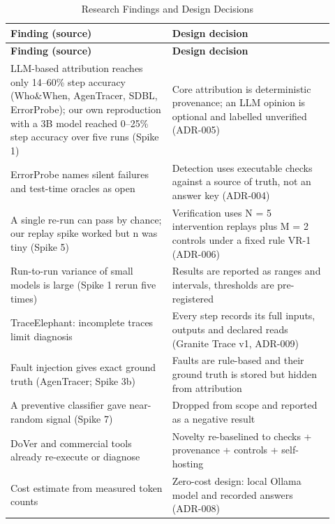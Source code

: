 {\small
\begin{longtable}{>{\raggedright\arraybackslash\hspace{0pt}}p{0.460\linewidth}>{\raggedright\arraybackslash\hspace{0pt}}p{0.460\linewidth}}
\caption{Research Findings and Design Decisions}\label{tab:chapter2_research-3}\\
\toprule
\textbf{Finding (source)} & \textbf{Design decision} \\
\midrule
\endfirsthead
\toprule
\textbf{Finding (source)} & \textbf{Design decision} \\
\midrule
\endhead
\bottomrule
\endlastfoot
LLM-based attribution reaches only 14--60\% step accuracy (Who\&When, AgenTracer, SDBL, ErrorProbe); our own reproduction with a 3B model reached 0--25\% step accuracy over five runs (Spike 1) & Core attribution is deterministic provenance; an LLM opinion is optional and labelled unverified (ADR-005) \\
ErrorProbe names silent failures and test-time oracles as open & Detection uses executable checks against a source of truth, not an answer key (ADR-004) \\
A single re-run can pass by chance; our replay spike worked but n was tiny (Spike 5) & Verification uses N = 5 intervention replays plus M = 2 controls under a fixed rule VR-1 (ADR-006) \\
Run-to-run variance of small models is large (Spike 1 rerun five times) & Results are reported as ranges and intervals, thresholds are pre-registered \\
TraceElephant: incomplete traces limit diagnosis & Every step records its full inputs, outputs and declared reads (Granite Trace v1, ADR-009) \\
Fault injection gives exact ground truth (AgenTracer; Spike 3b) & Faults are rule-based and their ground truth is stored but hidden from attribution \\
A preventive classifier gave near-random signal (Spike 7) & Dropped from scope and reported as a negative result \\
DoVer and commercial tools already re-execute or diagnose & Novelty re-baselined to checks + provenance + controls + self-hosting \\
Cost estimate from measured token counts & Zero-cost design: local Ollama model and recorded answers (ADR-008) \\
\end{longtable}
}
